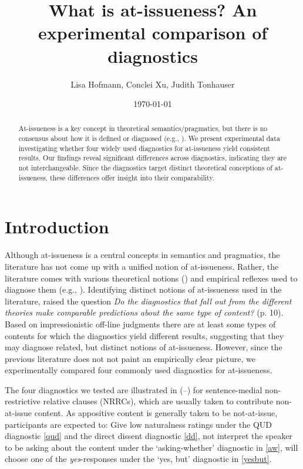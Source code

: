 \documentclass[12pt]{article}
\title{What is at-issueness? An experimental comparison of diagnostics}
\author{\normalsize Lisa Hofmann, Conclei Xu, Judith Tonhauser}
\date{\small\today}
\begin{document}
\maketitle
\begin{abstract}
  At-issueness is a key concept in theoretical semantics/pragmatics, but there is no consensus about how it is defined or diagnosed (e.g., \citealt{tonhauser_diagnosing_2012,tonhauser_how_2018,koev_notions_2018}). We present experimental data investigating whether four widely used diagnostics for at-issueness yield consistent results. Our findings reveal significant differences across diagnostics, indicating they are not interchangeable. Since the diagnostics target distinct theoretical conceptions of at-issueness, these differences offer insight into their comparability.
\end{abstract}
\setcounter{tocdepth}{2}
\tableofcontents
\pagebreak


\section{Introduction}
\label{sec:1_introduction}
  Although at-issueness is a central concepts in semantics and pragmatics, the literature has not come up with a unified notion of at-issueness. Rather, the literature comes with various theoretical notions (\citealt{koev_notions_2018,tonhauser_how_2018}) and empirical reflexes used to diagnose them (e.g., \citealt{tonhauser_diagnosing_2012}). Identifying distinct notions of at-issueness used in the literature, \citealt{koev_notions_2018} raised the question \emph{Do the diagnostics that fall out from the different theories make comparable predictions about the same type of content?} (p. 10). Based on impressionistic off-line judgments there are at least some types of contents for which the diagnostics yield different results, suggesting that they may diagnose related, but distinct notions of at-issueness. However, since the previous literature does not not paint an empirically clear picture, we experimentally compared four commonly used diagnostics for at\hyp issueness.

  The four diagnostics we tested are illustrated in (--) for sentence-medial non-restrictive relative clauses (NRRCs), which are usually taken to contribute non-at-issue content.  As appositive content is generally taken to be not-at-issue, participants are expected to: Give low naturalness ratings under the QUD diagnostic \ref{qud} and the direct dissent diagnostic \ref{dd}, not interpret the speaker to be asking about the content under the `asking-whether' diagnostic in \ref{aw}, will choose one of the %
    \emph{yes}-responses under the `yes, but' diagnostic in \ref{yesbut}.
\end{document}
